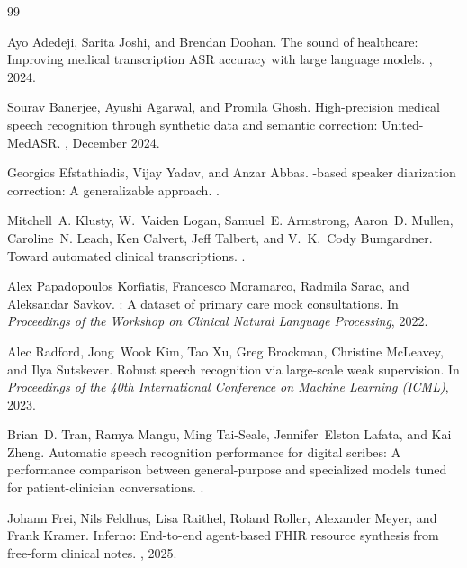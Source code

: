 
%

\begin{thebibliography}{99}


Ayo Adedeji, Sarita Joshi, and Brendan Doohan.
\newblock The sound of healthcare: Improving medical transcription {ASR}
  accuracy with large language models.
, 2024.

Sourav Banerjee, Ayushi Agarwal, and Promila Ghosh.
\newblock High-precision medical speech recognition through synthetic data and
  semantic correction: {United-MedASR}.
, December 2024.

Georgios Efstathiadis, Vijay Yadav, and Anzar Abbas.
-based speaker diarization correction: A generalizable approach.
.

Mitchell~A. Klusty, W.~Vaiden Logan, Samuel~E. Armstrong, Aaron~D. Mullen,
  Caroline~N. Leach, Ken Calvert, Jeff Talbert, and V.~K.~Cody Bumgardner.
\newblock Toward automated clinical transcriptions.
.

Alex {Papadopoulos Korfiatis}, Francesco Moramarco, Radmila Sarac, and
  Aleksandar Savkov.
: A dataset of primary care mock consultations.
\newblock In {\em Proceedings of the Workshop on Clinical Natural Language
  Processing}, 2022.

Alec Radford, Jong~Wook Kim, Tao Xu, Greg Brockman, Christine McLeavey, and
  Ilya Sutskever.
\newblock Robust speech recognition via large-scale weak supervision.
\newblock In {\em Proceedings of the 40th International Conference on Machine
  Learning ({ICML})}, 2023.

Brian~D. Tran, Ramya Mangu, Ming Tai-Seale, Jennifer~Elston Lafata, and
  Kai Zheng.
\newblock Automatic speech recognition performance for digital scribes: A
  performance comparison between general-purpose and specialized models tuned
  for patient-clinician conversations.
.


Johann Frei, Nils Feldhus, Lisa Raithel, Roland Roller, Alexander Meyer, and
  Frank Kramer.
\newblock Inferno: End-to-end agent-based {FHIR} resource synthesis from
  free-form clinical notes.
, 2025.


\end{thebibliography}
